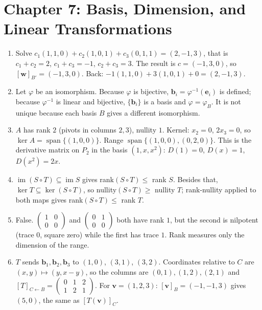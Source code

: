 \section*{Chapter 7: Basis, Dimension, and Linear Transformations}
\begin{enumerate}[label=\textbf{7.\arabic*}]
  \item Solve $c_{1}(1,1,0)+c_{2}(1,0,1)+c_{3}(0,1,1)=(2,-1,3)$, that is
        $c_{1}+c_{2}=2$, $c_{1}+c_{3}=-1$, $c_{2}+c_{3}=3$. The result is
        $c=(-1,3,0)$, so $[\mathbf{w}]_{B'}=(-1,3,0)$. Back:
        $-1(1,1,0)+3(1,0,1)+0=(2,-1,3)$.

  \item Let $\varphi$ be an isomorphism. Because $\varphi$ is bijective,
        $\mathbf{b}_{i}=\varphi^{-1}(\mathbf{e}_{i})$ is defined; because
        $\varphi^{-1}$ is linear and bijective, $\{\mathbf{b}_{i}\}$ is a basis and
        $\varphi=\varphi_{B}$. It is not unique because each basis $B$ gives a
        different isomorphism.

  \item $A$ has rank $2$ (pivots in columns $2,3$), nullity $1$. Kernel:
        $x_{2}=0$, $2x_{3}=0$, so $\ker A=\operatorname{span}\{(1,0,0)\}$.
        Range $\operatorname{span}\{(1,0,0),(0,2,0)\}$. This is the derivative matrix
        on $P_{2}$ in the basis $(1,x,x^{2})$: $D(1)=0$, $D(x)=1$,
        $D(x^{2})=2x$.

  \item $\operatorname{im}(S\circ T)\subseteq\operatorname{im}S$ gives
        rank$(S\circ T)\le$ rank $S$. Besides that,
        $\ker T\subseteq\ker(S\circ T)$, so nullity$(S\circ T)\ge$ nullity $T$;
        rank-nullity applied to both maps gives rank$(S\circ T)\le$ rank $T$.

  \item False. $\begin{pmatrix}1&0\\0&0\end{pmatrix}$ and
        $\begin{pmatrix}0&1\\0&0\end{pmatrix}$ both have rank $1$, but
        the second is nilpotent (trace $0$, square zero) while the first
        has trace $1$. Rank measures only the dimension of the range.

  \item $T$ sends $\mathbf{b}_{1},\mathbf{b}_{2},\mathbf{b}_{3}$ to $(1,0)$,
        $(3,1)$, $(3,2)$. Coordinates relative to $C$ are $(x,y)\mapsto(y,x-y)$,
        so the columns are $(0,1),(1,2),(2,1)$ and
        $[T]_{C\leftarrow B}=\begin{pmatrix}0&1&2\\1&2&1\end{pmatrix}$.
        For $\mathbf{v}=(1,2,3)$: $[\mathbf{v}]_{B}=(-1,-1,3)$ gives
        $(5,0)$, the same as $[T(\mathbf{v})]_{C}$.


\end{enumerate}
